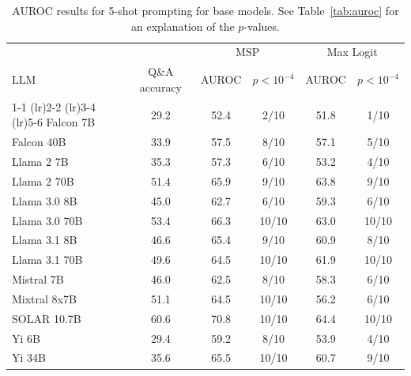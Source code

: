\begin{table}[h]
\caption{AUROC results for 5-shot prompting for base models. See Table~\ref{tab:auroc} for an explanation of the $p$-values.}
\label{tab:auroc_max}
\centering
\begin{tabular}{lccccc}
\toprule
& & \multicolumn{2}{c}{MSP} & \multicolumn{2}{c}{Max Logit} \\ 
LLM & Q\&A accuracy & AUROC & $p < 10^{-4}$ & AUROC & $p < 10^{-4}$ \\ 
\cmidrule(lr){1-1} \cmidrule(lr){2-2} \cmidrule(lr){3-4} \cmidrule(lr){5-6} 
Falcon 7B & 29.2 & 52.4 & 2/10 & 51.8 & 1/10\\
Falcon 40B & 33.9 & 57.5 & 8/10 & 57.1 & 5/10\\
Llama 2 7B & 35.3 & 57.3 & 6/10 & 53.2 & 4/10\\
Llama 2 70B & 51.4 & 65.9 & 9/10 & 63.8 & 9/10\\
Llama 3.0 8B & 45.0 & 62.7 & 6/10 & 59.3 & 6/10\\
Llama 3.0 70B & 53.4 & 66.3 & 10/10 & 63.0 & 10/10\\
Llama 3.1 8B & 46.6 & 65.4 & 9/10 & 60.9 & 8/10\\
Llama 3.1 70B & 49.6 & 64.5 & 10/10 & 61.9 & 10/10\\
Mistral 7B & 46.0 & 62.5 & 8/10 & 58.3 & 6/10\\
Mixtral 8x7B & 51.1 & 64.5 & 10/10 & 56.2 & 6/10\\
SOLAR 10.7B & 60.6 & 70.8 & 10/10 & 64.4 & 10/10\\
Yi 6B & 29.4 & 59.2 & 8/10 & 53.9 & 4/10\\
Yi 34B & 35.6 & 65.5 & 10/10 & 60.7 & 9/10\\
\bottomrule
\end{tabular}
\end{table}
